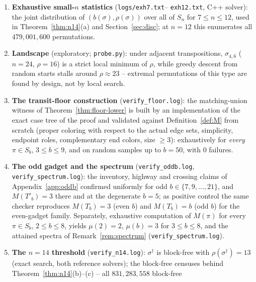 \documentclass[11pt]{article}
\theoremstyle{definition}
\begin{document}
\begin{enumerate}
Every exact value equals $2a + 2b - 4$ and sits inside the proven window
$[2a{+}2b{-}7,\ 4a{+}2b]$ of \eqref{eq:twosided}; the two rows at $n = 480$ (differing
in $\rho$) illustrate that $\rho(\sigma_{a,b})$ tracks $a$ and $b$ separately, not just
their product. At $n = 720$ the ratio $0.150$ is far below any ratio that the
block-reversal experiments of Section~\ref{sec:halfbound} suggested was attainable.
\item \textbf{Exhaustive small-$n$ statistics} (\texttt{logs/exh7.txt}--%
\texttt{exh12.txt}, C++ solver): the joint distribution of $(b(\sigma), \rho(\sigma))$
over all of $S_n$ for $7 \le n \le 12$, used in Theorem~\ref{thm:n14}(a) and
Section~\ref{sec:disc}; at $n = 12$ this enumerates all $479{,}001{,}600$
permutations.
\item \textbf{Landscape} (exploratory; \texttt{probe.py}): under adjacent
transpositions, $\sigma_{4,6}$ ($n = 24$, $\rho = 16$) is a strict local minimum of
$\rho$, while greedy descent from random starts stalls around $\rho \approx 23$ --
extremal permutations of this type are found by design, not by local search.
\item \textbf{The transit-floor construction} (\texttt{verify\_floor.log}): the
matching-union witness of
Theorem~\ref{thm:floor-lower} is built by an implementation of the exact case tree of
the proof and validated against Definition~\ref{def:M} from scratch (proper coloring
with respect to the actual edge sets, simplicity, endpoint roles, complementary end
colors, size $\ge 3$): exhaustively for \emph{every} $\pi \in S_b$, $3 \le b \le 9$,
and on random samples up to $b = 50$, with $0$ failures.
\item \textbf{The odd gadget and the spectrum} (\texttt{verify\_oddb.log},
\texttt{verify\_spectrum.log}): the inventory, highway and crossing claims of
Appendix~\ref{app:oddb} confirmed uniformly for odd $b \in \{7, 9, \dots, 21\}$, and
$M(T'_b) = 3$ there and at the degenerate $b = 5$; as positive control the same
checker reproduces $M(T_b) = 3$ (even $b$) and $M(T_b) = b$ (odd $b$) for the
even-gadget family. Separately, exhaustive computation of $M(\pi)$ for every
$\pi \in S_b$, $2 \le b \le 8$, yields $\mu(2) = 2$, $\mu(b) = 3$ for $3 \le b \le 8$,
and the attained spectra of Remark~\ref{rem:spectrum}
(\texttt{verify\_spectrum.log}).
\item \textbf{The $n = 14$ threshold} (\texttt{verify\_n14.log}): $\sigma^\dagger$
is block-free with
$\rho(\sigma^\dagger) = 13$ (exact search, both reference solvers); the block-free
censuses behind Theorem~\ref{thm:n14}(b)--(c) -- all $831{,}283{,}558$ block-free

\end{enumerate}
\end{document}
